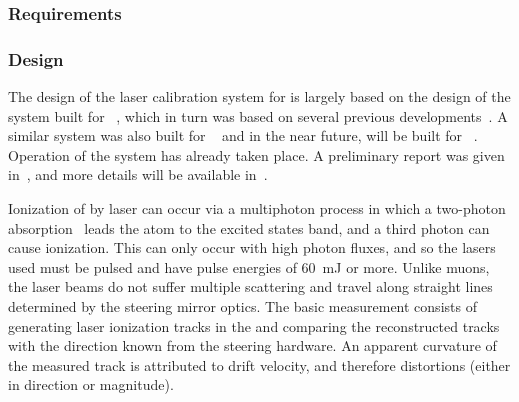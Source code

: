 




\subsubsection{Requirements}
\label{sec:sp-calib-laser-req}



\subsubsection{Design}
\label{sec:sp-calib-sys-las-ion-des}

The design of the laser calibration system for  is largely based on the design of the system built for ~\cite{microboone}, which in turn was based on several previous developments~\cite{Rossi:2009im,Zeller:2013sva,Ereditato:2014lra,Ereditato:82014tya}. A similar system was also built for ~\cite{Berns:2013usa} and in the near future, will be built for ~\cite{Antonello:2015lea}. Operation of the  system has already taken place. A preliminary report was given in~\cite{bib:chen2018}, and more details will be available in~\cite{bib:uBlaser2019}.

Ionization of  by laser can occur via a multiphoton process in which a two-photon absorption~\cite{Badhrees:2010zz} leads the atom to the excited states band, and a third photon can cause ionization. This can only occur with high photon fluxes, and so the lasers used must be pulsed and have pulse energies of \SI{60}{\milli\joule} or more. Unlike muons, the laser beams do not suffer multiple scattering and travel along straight lines determined by the steering mirror optics. The basic measurement consists of %
generating laser ionization tracks in the  and comparing the reconstructed tracks with the direction known from the steering hardware. 
An apparent curvature of the measured track is attributed to drift velocity, and therefore \efield distortions (either in direction or magnitude).

